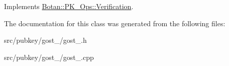 Implements \hyperlink{classBotan_1_1PK__Ops_1_1Verification_af66d51b7b6ae5e9b851815df23f7db7c}{Botan\-::\-P\-K\-\_\-\-Ops\-::\-Verification}.



The documentation for this class was generated from the following files\-:\begin{DoxyCompactItemize}
\item 
src/pubkey/gost\-\_/gost\-\_.\-h\item 
src/pubkey/gost\-\_/gost\-\_.\-cpp\end{DoxyCompactItemize}
